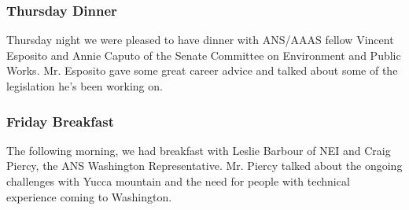 \subsubsection*{Thursday Dinner}

Thursday night we were pleased to have dinner with ANS/AAAS fellow Vincent
Esposito and Annie Caputo of the Senate Committee on Environment and Public
Works. Mr. Esposito gave some great career advice and talked about some of the
legislation he's been working on.  

\subsubsection*{Friday Breakfast}

The following morning, we had breakfast with Leslie Barbour of NEI and Craig
Piercy, the ANS Washington Representative. Mr. Piercy talked about the ongoing
challenges with Yucca mountain and the need for people with technical experience
coming to Washington.
